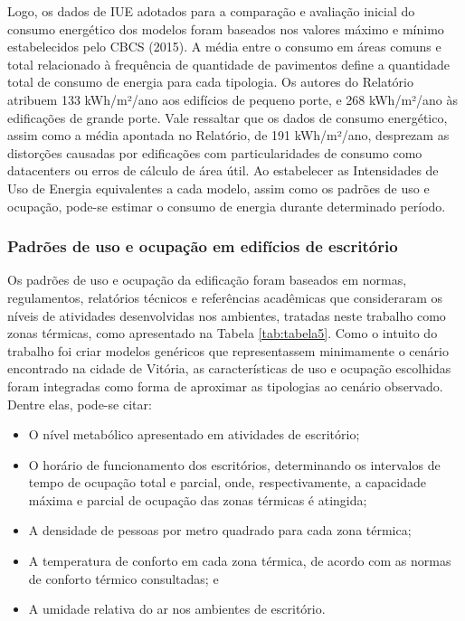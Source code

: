 \noindent Logo, os dados de IUE adotados para a comparação e avaliação inicial do consumo energético dos 
modelos foram baseados nos valores máximo e mínimo estabelecidos pelo CBCS (2015). A média 
entre o consumo em áreas comuns e total relacionado à frequência de quantidade de pavimentos 
define a quantidade total de consumo de energia para cada tipologia.\vspace*{0.3cm} \newline
Os autores do Relatório atribuem 133 kWh/m²/ano aos edifícios de pequeno porte, e 
268 kWh/m²/ano às edificações de grande porte. Vale ressaltar que os dados de consumo 
energético, assim como a média apontada no Relatório, de 191 kWh/m²/ano, desprezam as 
distorções causadas por edificações com particularidades de consumo como datacenters ou erros 
de cálculo de área útil.\vspace*{0.3cm} \newline
Ao estabelecer as Intensidades de Uso de Energia equivalentes a cada modelo, assim como os 
padrões de uso e ocupação, pode-se estimar o consumo de energia durante determinado período.

\subsubsection{Padrões de uso e ocupação em edifícios de escritório}
Os padrões de uso e ocupação da edificação foram baseados em normas, regulamentos, relatórios 
técnicos e referências acadêmicas que consideraram os níveis de atividades desenvolvidas nos 
ambientes, tratadas neste trabalho como zonas térmicas, como apresentado na Tabela \ref{tab:tabela5}.\vspace*{0.3cm} \newline
Como o intuito do trabalho foi criar modelos genéricos que representassem minimamente o 
cenário encontrado na cidade de Vitória, as características de uso e ocupação escolhidas 
foram integradas como forma de aproximar as tipologias ao cenário observado. Dentre elas, 
pode-se citar:
\begin{itemize}
    \item O nível metabólico apresentado em atividades de escritório;
    \item O horário de funcionamento dos escritórios, determinando os intervalos de tempo de ocupação total e parcial, onde, respectivamente, a capacidade máxima e parcial de ocupação das zonas térmicas é atingida;
    \item A densidade de pessoas por metro quadrado para cada zona térmica;
    \item A temperatura de conforto em cada zona térmica, de acordo com as normas de conforto térmico consultadas; e
    \item A umidade relativa do ar nos ambientes de escritório.
\end{itemize}

